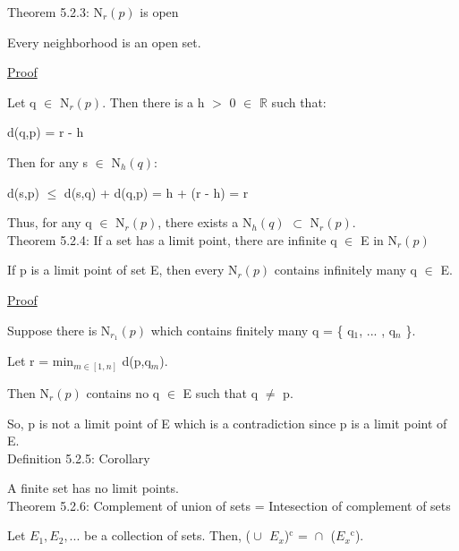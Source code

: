 	{ \color{red} Theorem 5.2.3: N$_r(p)$ is open } 

		\begin{adjustbox}{minipage=14cm, right}
			Every neighborhood is an open set.
		\end{adjustbox}

	{ \color{magenta} \underline{Proof} } 
	
		Let q $\in$ N$_r(p)$. Then there is a h $>$ 0 $\in$ $\mathbb{R}$ such that:

		\qquad d(q,p) = r - h

		Then for any s $\in$ N$_h(q)$:

		\qquad d(s,p) $\leq$  d(s,q) + d(q,p) = h + (r - h) = r

		Thus, for any q $\in$ N$_r(p)$, there exists a N$_h(q)$ $\subset$ N$_r(p)$. \\

	{ \color{red} Theorem 5.2.4: If a set has a limit point, there are infinite q
	$\in$ E in N$_r(p)$ } 
	
		\begin{adjustbox}{minipage=14cm, right}
			If p is a limit point of set E, then every N$_r(p)$ contains infinitely many q $\in$ E.
		\end{adjustbox}

	{ \color{magenta} \underline{Proof} } 
	
		Suppose there is N$_{r_1}(p)$ which contains finitely many q = \{ q$_1$, ... , q$_n$ \}.

		Let r = min$_{m \in [1,n]}$ d(p,q$_m$).

		Then N$_r(p)$ contains no q $\in$ E such that q $\not =$ p.

		So, p is not a limit point of E which is a contradiction since p is a limit point of E. \\

	{ \color{blue} Definition 5.2.5: Corollary } 
	
		\begin{adjustbox}{minipage=14cm, right}
			A finite set has no limit points. \\
		\end{adjustbox}

	{ \color{red} Theorem 5.2.6: Complement of union of sets = Intesection of complement of sets } 
	
		\begin{adjustbox}{minipage=14cm, right}
			Let $E_1, E_2 , ... $ be a collection of sets. Then,
			($\cup_{}^{}$ $E_x$)$^\text{c}$ = $\cap_{}^{}$ ($E_x$$^\text{c}$).
		\end{adjustbox}

